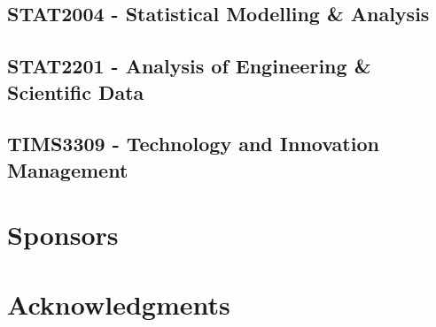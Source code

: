 \documentclass[a4paper,12pt]{report}
\begin{document}
\hypertarget{STAT2004}{\section{STAT2004 - Statistical Modelling \& Analysis}}

\hypertarget{STAT2201}{\section{STAT2201 - Analysis of Engineering \& Scientific Data}}

\hypertarget{TIMS3309}{\section{TIMS3309 - Technology and Innovation Management}}



\chapter{Sponsors}

\chapter{Acknowledgments}
\end{document}
